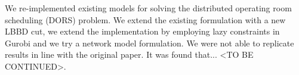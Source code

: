 We re-implemented existing models\cite{roshanaei2017propagating} for solving the distributed operating room scheduling (DORS) problem. We extend the existing formulation with a new LBBD cut, we extend the implementation by employing lazy constraints in Gurobi and we try a network model formulation. We were not able to replicate results in line with the original paper. It was found that... <TO BE CONTINUED>. %